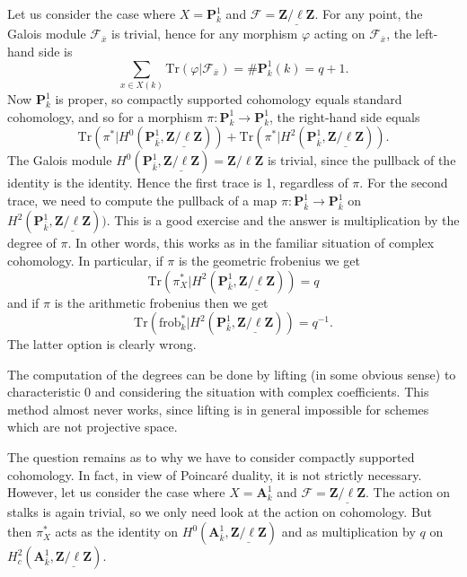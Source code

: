 Let us consider the case where $X = \mathbf{P}^1_k$ and $\mathcal{F} = 
\underline{\mathbf{Z}/\ell\mathbf{Z}}$. For any point, the Galois module 
$\mathcal{F}_{\bar x}$ is trivial, hence for any morphism $\varphi$ acting on 
$\mathcal{F}_{\bar x}$, the left-hand side is
$$
\sum_{x \in X(k)} \text{Tr}(\varphi | \mathcal{F}_{\bar x}) = 
\#\mathbf{P}^1_k(k) = q+1.
$$
Now $\mathbf{P}^1_k$ is proper, so compactly supported cohomology equals 
standard cohomology, and so for a morphism $\pi : \mathbf{P}^1_k \to 
\mathbf{P}^1_k$, the right-hand side equals
$$
\text{Tr}(\pi^* | H^0 (\mathbf{P}^1_{\bar k}, 
\underline{\mathbf{Z}/\ell\mathbf{Z}})) + \text{Tr}(\pi^* | H^2 
(\mathbf{P}^1_{\bar k}, \underline{\mathbf{Z}/\ell\mathbf{Z}})).
$$
The Galois module $H^0 (\mathbf{P}^1_{\bar k}, 
\underline{\mathbf{Z}/\ell\mathbf{Z}}) = \mathbf{Z}/\ell\mathbf{Z}$ is trivial, 
since the pullback of the identity is the identity. Hence the first trace is 1, 
regardless of $\pi$. For the second trace, we need to compute the pullback of a 
map $\pi: \mathbf{P}^1_{\bar k} \to \mathbf{P}^1_{\bar k}$ on $H^2 
(\mathbf{P}^1_{\bar k}, \underline{\mathbf{Z}/\ell\mathbf{Z}}))$. This is a 
good exercise and the answer is multiplication by the degree of $\pi$. In other 
words, this works as in the familiar situation of complex cohomology. In 
particular, if $\pi$ is the geometric frobenius we get 
$$
\text{Tr}(\pi_X^* | H^2 (\mathbf{P}^1_{\bar k}, 
\underline{\mathbf{Z}/\ell\mathbf{Z}})) = q
$$ 
and if $\pi$ is the arithmetic frobenius then we get 
$$
\text{Tr}(\text{frob}_k^* | H^2 (\mathbf{P}^1_{\bar k}, 
\underline{\mathbf{Z}/\ell\mathbf{Z}})) = q^{-1}.
$$
The latter option is clearly wrong. 

\begin{remark}
The computation of the degrees can be done by lifting (in some obvious sense) 
to characteristic 0 and considering the situation with complex coefficients. 
This method almost never works, since lifting is in general impossible for 
schemes which are not projective space.
\end{remark}

The question remains as to why we have to consider compactly supported 
cohomology. In fact, in view of Poincar\'e duality, it is not strictly 
necessary. However, let us consider the case where $X = \mathbf{A}^1_k$ and 
$\mathcal{F} = \underline{\mathbf{Z}/\ell\mathbf{Z}}$. The action on stalks is 
again trivial, so we only need look at the action on cohomology. But then 
$\pi_X^*$ acts as the identity on $H^0(\mathbf{A}^1_{\bar k}, 
\underline{\mathbf{Z}/\ell\mathbf{Z}})$ and as multiplication by $q$ on 
$H^2_c(\mathbf{A}^1_{\bar k}, \underline{\mathbf{Z}/\ell\mathbf{Z}})$. 

